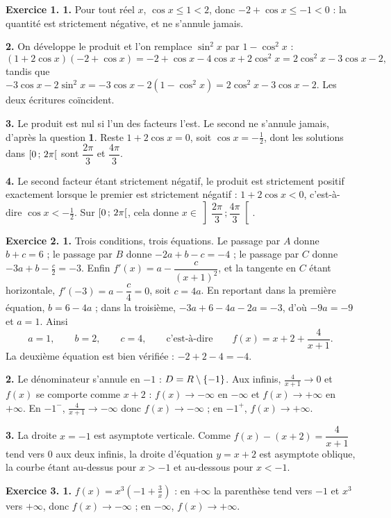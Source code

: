 \begin{corrige}
\textbf{Exercice 1. 1.} Pour tout réel $x$, $\cos x \leq 1 < 2$, donc
$-2+\cos x \leq -1 < 0$ : la quantité est strictement négative, et ne s'annule
jamais.

\textbf{2.} On développe le produit et l'on remplace $\sin^{2}x$ par
$1-\cos^{2}x$ :
\[
  (1+2\cos x)(-2+\cos x) = -2+\cos x-4\cos x+2\cos^{2}x
  = 2\cos^{2}x-3\cos x-2,
\]
tandis que
$-3\cos x-2\sin^{2}x = -3\cos x-2\left(1-\cos^{2}x\right)
= 2\cos^{2}x-3\cos x-2$. Les deux écritures coïncident.

\textbf{3.} Le produit est nul si l'un des facteurs l'est. Le second ne
s'annule jamais, d'après la question \textbf{1}. Reste
$1+2\cos x = 0$, soit $\cos x = -\frac12$, dont les solutions dans
$\left[0\,;\,2\pi\right[$ sont $\dfrac{2\pi}{3}$ et $\dfrac{4\pi}{3}$.

\textbf{4.} Le second facteur étant strictement négatif, le produit est
strictement positif exactement lorsque le premier est strictement négatif :
$1+2\cos x < 0$, c'est-à-dire $\cos x < -\frac12$. Sur
$\left[0\,;\,2\pi\right[$, cela donne
$x \in \left]\dfrac{2\pi}{3}\,;\dfrac{4\pi}{3}\right[$.

\medskip
\textbf{Exercice 2. 1.} Trois conditions, trois équations. Le passage par $A$
donne $b+c = 6$ ; le passage par $B$ donne $-2a+b-c = -4$ ; le passage par
$C$ donne $-3a+b-\frac{c}{2} = -3$. Enfin
$f'(x) = a-\dfrac{c}{(x+1)^{2}}$, et la tangente en $C$ étant horizontale,
$f'(-3) = a-\dfrac{c}{4} = 0$, soit $c = 4a$. En reportant dans la première
équation, $b = 6-4a$ ; dans la troisième,
$-3a+6-4a-2a = -3$, d'où $-9a = -9$ et $a = 1$. Ainsi
\[
  a = 1, \qquad b = 2, \qquad c = 4,
  \qquad\text{c'est-à-dire}\qquad
  f(x) = x+2+\frac{4}{x+1}.
\]
La deuxième équation est bien vérifiée : $-2+2-4 = -4$.

\textbf{2.} Le dénominateur s'annule en $-1$ : $D = R\setminus\{-1\}$. Aux
infinis, $\frac{4}{x+1}\to0$ et $f(x)$ se comporte comme $x+2$ : $f(x)\to
-\infty$ en $-\infty$ et $f(x)\to+\infty$ en $+\infty$. En $-1^{-}$,
$\frac{4}{x+1}\to-\infty$ donc $f(x)\to-\infty$ ; en $-1^{+}$,
$f(x)\to+\infty$.

\textbf{3.} La droite $x = -1$ est asymptote verticale. Comme
$f(x)-(x+2) = \dfrac{4}{x+1}$ tend vers $0$ aux deux infinis, la droite
d'équation $y = x+2$ est asymptote oblique, la courbe étant au-dessus pour
$x>-1$ et au-dessous pour $x<-1$.

\medskip
\textbf{Exercice 3. 1.} $f(x) = x^{3}\left(-1+\frac{3}{x}\right)$ : en
$+\infty$ la parenthèse tend vers $-1$ et $x^{3}$ vers $+\infty$, donc
$f(x)\to-\infty$ ; en $-\infty$, $f(x)\to+\infty$.


\end{corrige}
